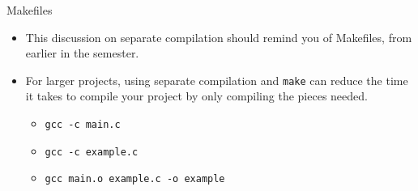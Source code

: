 \documentclass[graphics]{beamer}
\begin{document}
\begin{frame}{Makefiles}
    \begin{itemize}
        \item This discussion on separate compilation should remind you of Makefiles, from earlier in the semester.
        \item For larger projects, using separate compilation and \texttt{make} can reduce the time it takes to compile your project by only compiling the pieces needed.
        \begin{itemize}
            \item \texttt{gcc -c main.c}
            \item \texttt{gcc -c example.c}
            \item \texttt{gcc main.o example.c -o example}
        \end{itemize}
    \end{itemize}
\end{frame}
\end{document}
